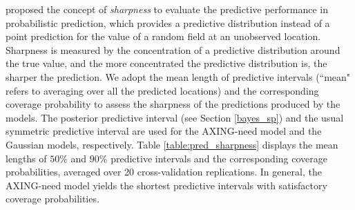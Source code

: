\documentclass[aoas,preprint]{imsart}
\numberwithin{equation}{section}
\theoremstyle{plain}
\begin{document}
\begin{table}[htp]
\caption{Coverage probabilities (CP) and mean lengths (mLen) of $50\%$ and $90\%$ predictive intervals, averaged over $20$ cross-validation replications}
\begin{center}
\end{center}
\label{table:pred_sharpness}
\end{table}%

\citet{Gneiting-07-Sharpness} proposed the concept of \emph{sharpness} to evaluate the predictive performance in probabilistic prediction, which provides a predictive distribution instead of a point prediction for the value of a random field at an unobserved location. Sharpness is measured by the concentration of a predictive distribution around the true value, and the more concentrated the predictive distribution is, the sharper the prediction. We adopt the mean length of predictive intervals (``mean" refers to averaging over all the predicted locations) and the corresponding coverage probability  to assess the sharpness of the predictions produced by the models. The posterior predictive interval (see Section \ref{bayes_sp}) and the usual symmetric predictive interval are used for the AXING-need model and the Gaussian models, respectively. Table \ref{table:pred_sharpness} displays the mean lengths of $50\%$ and $90\%$ predictive intervals and the corresponding coverage probabilities, averaged over 20 cross-validation replications. In general, the AXING-need model yields the shortest predictive intervals with satisfactory coverage probabilities.
\end{document}
